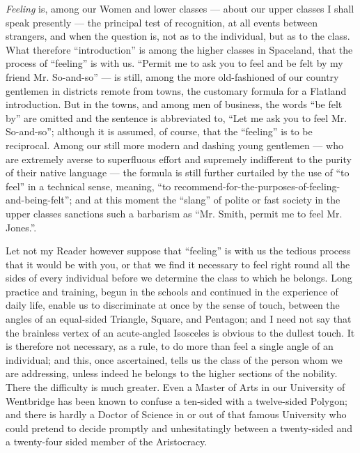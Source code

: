 \documentclass[10pt, kindle, oneside]{kindle}
\begin{document}
\emph{Feeling} is, among our Women and lower classes --- about our upper classes I
shall speak presently --- the principal test of recognition, at all events
between strangers, and when the question is, not as to the individual, but as
to the class. What therefore ``introduction'' is among the higher classes in
Spaceland, that the process of ``feeling'' is with us. ``Permit me to ask you to
feel and be felt by my friend Mr. So-and-so'' --- is still, among the more
old-fashioned of our country gentlemen in districts remote from towns, the
customary formula for a Flatland introduction. But in the towns, and among men
of business, the words ``be felt by'' are omitted and the sentence is
abbreviated to, ``Let me ask you to feel Mr. So-and-so''; although it is
assumed, of course, that the ``feeling'' is to be reciprocal. Among our still
more modern and dashing young gentlemen --- who are extremely averse to
superfluous effort and supremely indifferent to the purity of their native
language --- the formula is still further curtailed by the use of ``to feel'' in a
technical sense, meaning, ``to
recommend-for-the-purposes-of-feeling-and-being-felt''; and at this moment the
``slang'' of polite or fast society in the upper classes sanctions such a
barbarism as ``Mr. Smith, permit me to feel Mr. Jones.''.

Let not my Reader however suppose that ``feeling'' is with us the tedious
process that it would be with you, or that we find it necessary to feel right
round all the sides of every individual before we determine the class to which
he belongs. Long practice and training, begun in the schools and continued in
the experience of daily life, enable us to discriminate at once by the sense
of touch, between the angles of an equal-sided Triangle, Square, and Pentagon;
and I need not say that the brainless vertex of an acute-angled Isosceles is
obvious to the dullest touch. It is therefore not necessary, as a rule, to do
more than feel a single angle of an individual; and this, once ascertained,
tells us the class of the person whom we are addressing, unless indeed he
belongs to the higher sections of the nobility. There the difficulty is much
greater. Even a Master of Arts in our University of Wentbridge has been known
to confuse a ten-sided with a twelve-sided Polygon; and there is hardly a
Doctor of Science in or out of that famous University who could pretend to
decide promptly and unhesitatingly between a twenty-sided and a twenty-four
sided member of the Aristocracy.
\end{document}
